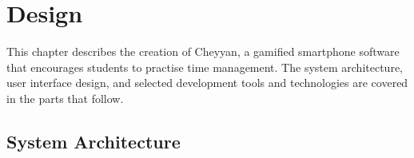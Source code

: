 \documentclass{l4proj}
\begin{document}


\chapter{Design}
This chapter describes the creation of Cheyyan, a gamified smartphone software that encourages students to practise time management. The system architecture, user interface design, and selected development tools and technologies are covered in the parts that follow.

\section{System Architecture}
\end{document}
